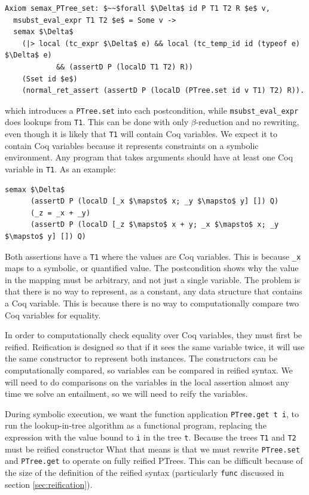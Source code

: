 \documentclass{puthesis}
\begin{document}
\begin{lstlisting}
Axiom semax_PTree_set: $~~$forall $\Delta$ id P T1 T2 R $e$ v,
  msubst_eval_expr T1 T2 $e$ = Some v ->
  semax $\Delta$
    (|> local (tc_expr $\Delta$ e) && local (tc_temp_id id (typeof e) $\Delta$ e) 
            && (assertD P (localD T1 T2) R))
    (Sset id $e$)
    (normal_ret_assert (assertD P (localD (PTree.set id v T1) T2) R)).
\end{lstlisting}

which introduces a \lstinline|PTree.set| into each postcondition,
while \lstinline|msubst_eval_expr| does lookups from
\lstinline|T1|. This can be done with only $\beta$-reduction and no
rewriting, even though it is likely that \lstinline|T1| will contain
Coq variables. We expect it to contain Coq variables because it
represents constraints on a symbolic environment. Any program that
takes arguments should have at least one Coq variable in
\lstinline|T1|. As an example:

\begin{lstlisting}
semax $\Delta$ 
      (assertD P (localD [_x $\mapsto$ x; _y $\mapsto$ y] []) Q) 
      (_z = _x + _y)
      (assertD P (localD [_z $\mapsto$ x + y; _x $\mapsto$ x; _y $\mapsto$ y] []) Q) 
\end{lstlisting}

Both assertions have a \lstinline|T1| where the values are Coq
variables. This is because \lstinline|_x| maps to a symbolic, or
quantified value.  The postcondition shows why the value in the
mapping must be arbitrary, and not just a single variable.  The
problem is that there is no way to represent, as a constant, any data
structure that contains a Coq variable. This is because there is no
way to computationally compare two Coq variables for equality.

 In
order to computationally check equality over Coq variables, they must
first be reified.  Reification is designed so that if it sees the same
variable twice, it will use the same constructor to represent both
instances. The constructors can be computationally compared, so
variables can be compared in reified syntax.  We will need to do
comparisons on the variables in the local assertion almost any time we
solve an entailment, so we will need to reify the variables.

During symbolic execution, we want the function application \lstinline|PTree.get t i|,
to run the lookup-in-tree algorithm as a functional
program, replacing the expression with the value bound to
\lstinline|i| in the tree \lstinline|t|. Because the trees
\lstinline|T1| and \lstinline|T2| must be reified constructor
What that means is that we must rewrite \lstinline|PTree.set| and
\lstinline|PTree.get| to operate on fully reified PTrees. 
 This can be
difficult because of the size of the definition of the reified syntax
(particularly \lstinline|func| discussed in section
\ref{sec:reification}). 
\end{document}
